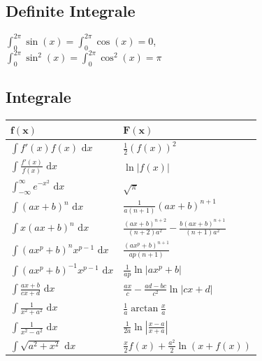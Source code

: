 \documentclass[a4paper,10pt]{article}
\def\dx{\text{ d}x}
\begin{document}
    \subsection{Definite Integrale}
    \begin{center}
	    $\int_0^{2\pi}\sin(x)=\int_0^{2\pi}\cos(x)=0$, \\$\int_0^{2\pi}\sin^2(x)=\int_0^{2\pi}\cos^2(x)=\pi$    	
    \end{center}

    \subsection{Integrale}
    
    \begin{center}
        \begin{tabularx}{\linewidth}{>{\centering\arraybackslash}X>{\centering\arraybackslash}X}
            \toprule
            $\mathbf{f(x)}$                      & $\mathbf{F(x)}$                                                  \\
            \midrule
            $\int f'(x) f(x) \dx$                & $\frac{1}{2}(f(x))^2$                                            \\
            $\int \frac{f'(x)}{f(x)} \dx$        & $\ln|f(x)|$                                                      \\
            $\int_{-\infty}^\infty e^{-x^2} \dx$ & $\sqrt{\pi}$                                                     \\
            $\int (ax+b)^n \dx$                  & $\frac{1}{a(n+1)}(ax+b)^{n+1}$                                   \\
            $\int x(ax+b)^n \dx$                 & $\frac{(ax+b)^{n+2}}{(n+2)a^2} - \frac{b(ax+b)^{n+1}}{(n+1)a^2}$ \\
            $\int (ax^p+b)^n x^{p-1} \dx$        & $\frac{(ax^p+b)^{n+1}}{ap(n+1)}$                                 \\
            $\int (ax^p + b)^{-1} x^{p-1} \dx$   & $\frac{1}{ap} \ln |ax^p + b|$                                    \\
            $\int \frac{ax+b}{cx+d} \dx$         & $\frac{ax}{c} - \frac{ad-bc}{c^2} \ln |cx +d|$                   \\
            $\int \frac{1}{x^2+a^2} \dx$         & $\frac{1}{a} \arctan \frac{x}{a}$                                \\
            $\int \frac{1}{x^2 - a^2} \dx$       & $\frac{1}{2a} \ln\left| \frac{x-a}{x+a} \right|$                 \\
            $\int \sqrt{a^2+x^2} \dx $           & $\frac{x}{2}f(x) + \frac{a^2}{2}\ln(x+f(x))$                     \\
            \bottomrule
        \end{tabularx}


\end{center}
\end{document}
